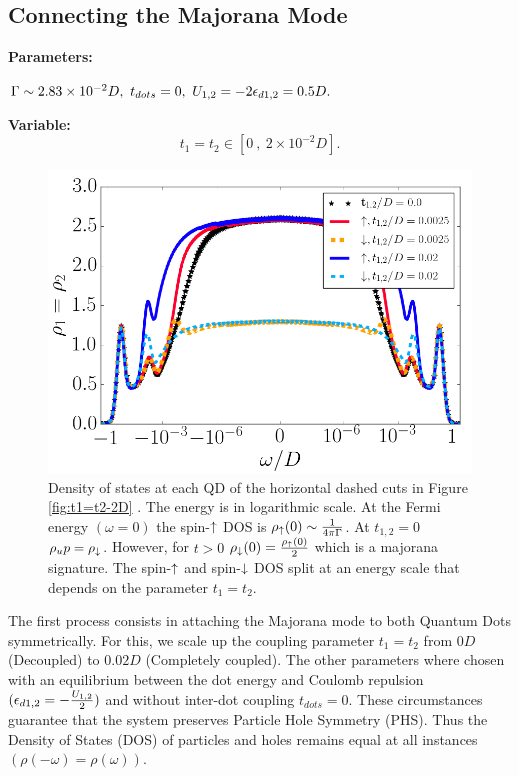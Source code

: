 \documentclass[showpacs,aps,prb,reprint,superscriptaddress]{revtex4-1}
\begin{document}
\subsection{Connecting the Majorana Mode \label{sub:t1=t2}}

\textbf{Parameters:}

    $\Gamma \sim 2.83\times10^{-2}D,\  t_{dots}=0 ,\  U_{1,2} = -2\epsilon_{d1,2} = 0.5D.$

\textbf{Variable:}
    $$t_1=t_2 \in [0\  ,\  2\times10^{-2}D].$$
    \begin{figure}[bt]
    \centering
    \includegraphics[scale=0.35]{Graficos/LogPlot.png}
    \caption{\label{fig:t1=t2/logplot} Density of states at each QD of the horizontal dashed cuts in Figure \ref{fig:t1=t2-2D} . The energy is in logarithmic scale. At the Fermi energy $(\omega =0)$ the spin-$\uparrow$ DOS is $\rho_\uparrow(0) \sim \frac{1}{4\pi\Gamma}$. At $t_{1,2}=0$ $\rho_up=\rho_\downarrow$. However, for  $t>0$  $\rho_\downarrow(0) = \frac{\rho_\uparrow(0)}{2}$ which is a majorana signature. The spin-$\uparrow$ and spin-$\downarrow$ DOS split at an energy scale that depends on the parameter $t_{1}=t_2$.}
    \end{figure}


    
The first process consists in attaching the Majorana mode to both Quantum Dots symmetrically. For this, we scale up the coupling parameter $t_1=t_2$ from $0D$ (Decoupled) to $0.02D$ (Completely coupled). The other parameters where chosen with an equilibrium between the dot energy and Coulomb repulsion $(\epsilon_{d1,2}=-\frac{U_{1,2}}{2})$  and  without inter-dot coupling $t_{dots}=0$. These circumstances guarantee that the system preserves Particle Hole Symmetry (PHS). Thus the Density of States (DOS) of particles and holes remains equal at all instances $(\rho(-\omega) = \rho(\omega))$. \\
    
\end{document}
